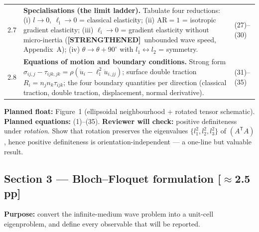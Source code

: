 \documentclass[11pt,a4paper]{article}
\newcommand{\bp}[1]{\textcolor{accent}{\textsf{\footnotesize [#1]}}}
\newcommand{\STR}{{\color{strcol}\textbf{[STRENGTHENED]}}}
\begin{document}
\begin{tabularx}{\textwidth}{@{}L{1.5cm} Y L{3.4cm}@{}}
2.7 & \textbf{Specialisations (the limit ladder).} Tabulate four reductions: (i) $l\to0,\ \ell_{\mathrm i}\to0$ = classical elasticity; (ii) $\mathrm{AR}=1$ = isotropic gradient elasticity; (iii) $\ell_{\mathrm i}\to0$ = gradient elasticity without micro-inertia (\STR\ unbounded wave speed, Appendix~A); (iv) $\theta\to\theta+90^\circ$ with $l_1\leftrightarrow l_2$ = symmetry. & (27)--(30) \\
2.8 & \textbf{Equations of motion and boundary conditions.} Strong form $\sigma_{ij,j}-\tau_{ijk,jk}=\rho(\ddot u_i-\ell_{\mathrm i}^2\ddot u_{i,jj})$; surface double traction $R_i=n_jn_k\tau_{ijk}$; the four boundary quantities per direction (classical traction, double traction, displacement, normal derivative). & (31)--(35) \\
\bottomrule
\end{tabularx}

\textbf{Planned float:} Figure~1 (ellipsoidal neighbourhood + rotated tensor schematic).
\textbf{Planned equations:} (1)--(35).
\textcolor{warn}{\textbf{Reviewer will check:}} positive definiteness under \emph{rotation}. Show that
rotation preserves the eigenvalues $\{l_1^2,l_2^2,l_3^2\}$ of $(A^{\mathsf T}\!A)$, hence
positive definiteness is orientation-independent --- a one-line but valuable result.

\subsection{Section 3 --- Bloch--Floquet formulation \bp{$\approx$2.5 pp}}

\textbf{Purpose:} convert the infinite-medium wave problem into a unit-cell eigenproblem,
and define every observable that will be reported.
\end{document}
